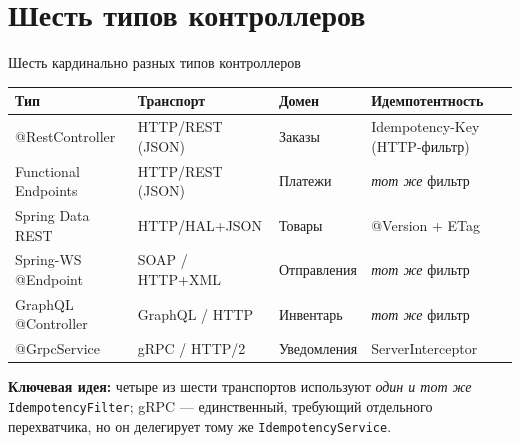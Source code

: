 \documentclass[aspectratio=169]{beamer}
\begin{document}
\section{Шесть типов контроллеров}
\begin{frame}{Шесть кардинально разных типов контроллеров}
\scriptsize
\begin{table}
\centering
\begin{tabular}{@{}p{2.8cm}p{3.3cm}p{2.3cm}p{3.4cm}@{}}
\toprule
\textbf{Тип} & \textbf{Транспорт} & \textbf{Домен} & \textbf{Идемпотентность} \\
\midrule
@RestController        & HTTP/REST (JSON)    & Заказы        & Idempotency-Key (HTTP-фильтр) \\
Functional Endpoints   & HTTP/REST (JSON)    & Платежи       & \emph{тот же} фильтр \\
Spring Data REST       & HTTP/HAL+JSON       & Товары        & @Version + ETag \\
Spring-WS @Endpoint    & SOAP / HTTP+XML     & Отправления   & \emph{тот же} фильтр \\
GraphQL @Controller    & GraphQL / HTTP      & Инвентарь     & \emph{тот же} фильтр \\
@GrpcService           & gRPC / HTTP/2       & Уведомления   & ServerInterceptor \\
\bottomrule
\end{tabular}
\end{table}

\vspace{2mm}
\textbf{Ключевая идея:} четыре из шести транспортов используют \emph{один и тот же} \texttt{IdempotencyFilter}; gRPC --- единственный, требующий отдельного перехватчика, но он делегирует тому же \texttt{IdempotencyService}.
\end{frame}

\end{document}
